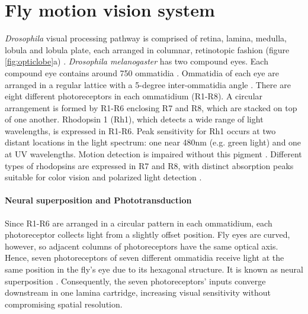\section{Fly motion vision system}
\textit{Drosophila} visual processing pathway is comprised of retina, lamina, medulla, lobula and lobula plate, each arranged in columnar, retinotopic fashion (figure \ref{fig:opticlobe}a) \parencite{Fischbach1989}. \textit{Drosophila melanogaster} has two compound eyes. Each compound eye contains around 750 ommatidia \parencite{Ready1976}. 
Ommatidia of each eye are arranged in a regular lattice with a 5-degree inter-ommatidia angle \parencite{Land1997}. There are eight different photoreceptors in each ommatidium (R1-R8). A circular arrangement is formed by R1-R6 enclosing R7 and R8, which are stacked on top of one another. Rhodopsin 1 (Rh1), which detects a wide range of light wavelengths, is expressed in R1-R6. Peak sensitivity for Rh1 occurs at two distant locations in the light spectrum: one near 480nm (e.g. green light) and one at UV wavelengths. Motion detection is impaired without this pigment \parencite{Rister2007}. Different types of rhodopsins are expressed in R7 and R8, with distinct absorption peaks suitable for color vision and polarized light detection \parencite{Yamaguchi2008, Wernet2004}.

\paragraph{Neural superposition and Phototransduction}
Since R1-R6 are arranged in a circular pattern in each ommatidium, each photoreceptor collects light from a slightly offset position. Fly eyes are curved, however, so adjacent columns of photoreceptors have the same optical axis. Hence, seven photoreceptors of seven different ommatidia receive light at the same position in the fly's eye due to its hexagonal structure. It is known as neural superposition \parencite{Kirschfeld1967}. Consequently, the seven photoreceptors' inputs converge downstream in one lamina cartridge, increasing visual sensitivity without compromising spatial resolution.

